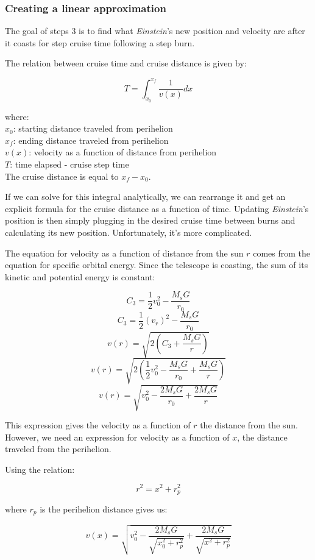 \documentclass[12pt]{article} %
\begin{document}
\subsubsection{Creating a linear approximation}
The goal of steps 3 is to find what \textit{Einstein}'s new position and velocity are after it coasts for step cruise time following a step burn.

The relation between cruise time and cruise distance is given by: 

$$T = \int_{x_0}^{x_f} \frac{1}{v(x)} dx$$

where:\\
$x_0$: starting distance traveled from perihelion\\
$x_f$: ending distance traveled from perihelion\\
$v(x)$: velocity as a function of distance from perihelion\\
$T$: time elapsed - cruise step time\\

The cruise distance is equal to $x_f - x_0$.

If we can solve for this integral analytically, we can rearrange it and get an explicit formula for the cruise distance as a function of time. Updating \textit{Einstein}'s position is then simply plugging in the desired cruise time between burns and calculating its new position. Unfortunately, it's more complicated.

The equation for velocity as a function of distance from the sun $r$ comes from the equation for specific orbital energy. Since the telescope is coasting, the sum of its kinetic and potential energy is constant:

$$C_3 = \frac{1}{2}v_0^2-\frac{M_sG}{r_0}$$
$$C_3 = \frac{1}{2}(v_r)^2 - \frac{M_sG}{r_0}$$
$$v(r) = \sqrt{2  (C_3 + \frac{M_sG}{r})}$$
$$v(r) = \sqrt{2  (\frac{1}{2}v_0^2-\frac{M_sG}{r_0} + \frac{M_sG}{r})}$$
$$v(r) = \sqrt{v_0^2-\frac{2M_sG}{r_0} + \frac{2M_sG}{r}}$$

This expression gives the velocity as a function of $r$ the distance from the sun. However, we need an expression for velocity as a function of $x$, the distance traveled from the perihelion. 

Using the relation:

$$r^2 = x^2 + r_p^2$$

where $r_p$ is the perihelion distance gives us:

$$v(x) = \sqrt{v_0^2-\frac{2M_sG}{\sqrt{x_0^2 + r_p^2}} + \frac{2M_sG}{\sqrt{x^2 + r_p^2}}}$$
\end{document}
